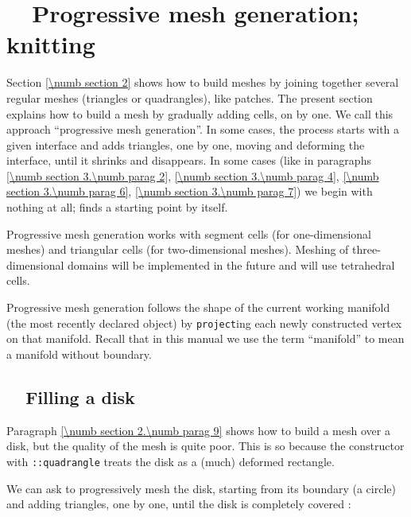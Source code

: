 
\chapter{~~Progressive mesh generation; knitting}\label{\numb section 3}

Section \ref{\numb section 2} shows how to build meshes by joining together several regular meshes
(triangles or quadrangles), like patches.
The present section explains how to build a mesh by gradually adding cells, on by one.
We call this approach ``progressive mesh generation''.
In some cases, the process starts with a given interface and adds triangles, one by one,
moving and deforming the interface, until it shrinks and disappears.
In some cases (like in paragraphs \ref{\numb section 3.\numb parag 2},
\ref{\numb section 3.\numb parag 4}, \ref{\numb section 3.\numb parag 6},
\ref{\numb section 3.\numb parag 7}) we begin with nothing at all;
{\maniFEM} finds a starting point by itself.

Progressive mesh generation works with segment cells (for one-dimensional meshes) and
triangular cells (for two-dimensional meshes).
Meshing of three-dimensional domains will be implemented in the future and will use tetrahedral
cells.

Progressive mesh generation follows the shape of the current working manifold (the most recently
declared {\small\tt {}} object) by {\small\tt project}ing each newly constructed vertex
on that manifold.
Recall that in this manual we use the term ``manifold'' to mean a manifold without boundary.


\section{~~Filling a disk}\label{\numb section 3.\numb parag 1}

Paragraph \ref{\numb section 2.\numb parag 9} shows how to build a mesh over a disk,
but the quality of the mesh is quite poor.
This is so because the {\small\tt {}} constructor with {\small\tt {}::quadrangle} treats the
disk as a (much) deformed rectangle.

We can ask {\maniFEM} to progressively mesh the disk, starting from its boundary (a circle)
and adding triangles, one by one, until the disk is completely covered :

